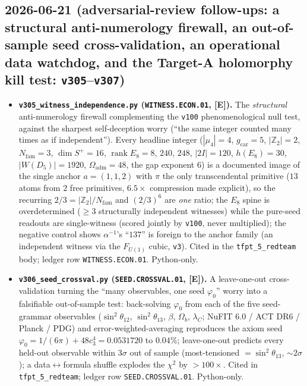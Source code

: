 \documentclass[11pt]{article}
\providecommand{\mE}{\textbf{[E]}}\providecommand{\mC}{\textbf{[C]}}
\begin{document}
\subsection*{2026-06-21 (adversarial-review follow-ups: a structural anti-numerology firewall, an out-of-sample seed cross-validation, an operational data watchdog, and the Target-A holomorphy kill test: \texttt{v305}--\texttt{v307})}
\begin{itemize}
\item \textbf{\texttt{v305\_witness\_independence.py} (\texttt{WITNESS.ECON.01}, \mE).} The \emph{structural} anti-numerology
  firewall complementing the \texttt{v100} phenomenological null test, against the sharpest self-deception worry
  (``the same integer counted many times as if independent''). Every headline integer ($|\mu_4|{=}4$,
  $g_{\mathrm{car}}{=}5$, $|\mathbb Z_2|{=}2$, $N_{\mathrm{fam}}{=}3$, $\dim S^+{=}16$, $\operatorname{rank}E_8{=}8$,
  $240$, $248$, $|2I|{=}120$, $h(E_8){=}30$, $|W(D_5)|{=}1920$, $\Omega_{\mathrm{adm}}{=}48$, the gap exponent $6$)
  is a documented image of the single anchor $a{=}(1,1,2)$ with $\pi$ the only transcendental primitive ($13$ atoms
  from $2$ free primitives, $6.5\times$ compression made explicit), so the recurring $2/3{=}|\mathbb Z_2|/N_{\mathrm{fam}}$
  and $(2/3)^6$ are \emph{one} ratio; the $E_8$ spine is overdetermined ($\ge3$ structurally independent witnesses)
  while the pure-seed readouts are single-witness (scored jointly by \texttt{v100}, never multiplied); the negative
  control shows $\alpha^{-1}$'s ``$137$'' is foreign to the anchor family (an independent witness via the $F_{U(1)}$
  cubic, \texttt{v3}). Cited in the \texttt{tfpt\_5\_redteam} body; ledger row \texttt{WITNESS.ECON.01}. Python-only.
\item \textbf{\texttt{v306\_seed\_crossval.py} (\texttt{SEED.CROSSVAL.01}, \mE).} A leave-one-out cross-validation
  turning the ``many observables, one seed $\varphi_0$'' worry into a falsifiable out-of-sample test: back-solving
  $\varphi_0$ from each of the five seed-grammar observables ($\sin^2\theta_{12}$, $\sin^2\theta_{13}$, $\beta$,
  $\Omega_b$, $\lambda_C$; NuFIT 6.0 / ACT DR6 / Planck / PDG) and error-weighted-averaging reproduces the axiom seed
  $\varphi_0=1/(6\pi)+48c_3^4=0.0531720$ to $0.04\%$; leave-one-out predicts every held-out observable within $3\sigma$
  out of sample (most-tensioned $=\sin^2\theta_{13}$, ${\sim}2\sigma$); a data$\leftrightarrow$formula shuffle explodes
  the $\chi^2$ by $>100\times$. Cited in \texttt{tfpt\_5\_redteam}; ledger row \texttt{SEED.CROSSVAL.01}. Python-only.

\end{itemize}
\end{document}
